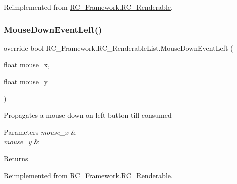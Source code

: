 Reimplemented from \mbox{\hyperlink{class_r_c___framework_1_1_r_c___renderable_af929e80b7c88bb21b01358f47ad36a64}{R\+C\+\_\+\+Framework.\+R\+C\+\_\+\+Renderable}}.

\mbox{\label{class_r_c___framework_1_1_r_c___renderable_list_adce00726f7093db725ed6195292156a7}} 
\subsubsection{\texorpdfstring{Mouse\+Down\+Event\+Left()}{MouseDownEventLeft()}}
{\footnotesize\ttfamily override bool R\+C\+\_\+\+Framework.\+R\+C\+\_\+\+Renderable\+List.\+Mouse\+Down\+Event\+Left (\begin{DoxyParamCaption}\item[{float}]{mouse\+\_\+x,  }\item[{float}]{mouse\+\_\+y }\end{DoxyParamCaption})\hspace{0.3cm}{\ttfamily [virtual]}}



Propagates a mouse down on left button till consumed 


\begin{DoxyParams}{Parameters}
{\em mouse\+\_\+x} & \\
\hline
{\em mouse\+\_\+y} & \\
\hline
\end{DoxyParams}
\begin{DoxyReturn}{Returns}

\end{DoxyReturn}


Reimplemented from \mbox{\hyperlink{class_r_c___framework_1_1_r_c___renderable_a41d144d6fad27f219d861e61a2d9796e}{R\+C\+\_\+\+Framework.\+R\+C\+\_\+\+Renderable}}.

\mbox{\label{class_r_c___framework_1_1_r_c___renderable_list_a5867cf3044d40adda1bb7c2be3211a99}} 
